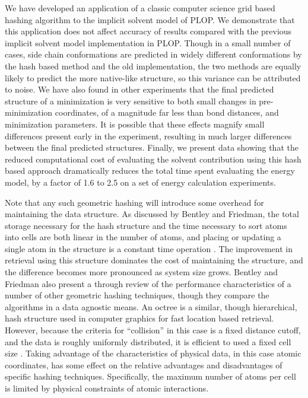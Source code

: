 We have developed an application of a classic computer science grid based hashing algorithm to the implicit solvent model of PLOP.
We demonstrate that this application does not affect accuracy of results compared with the previous implicit solvent model implementation in PLOP.
Though in a small number of cases, side chain conformations are predicted in widely different conformations by the hash based method and the old implementation, the two methods are equally likely to predict the more native-like structure, so this variance can be attributed to noise.
We have also found in other experiments that the final predicted structure of a minimization is very sensitive to both small changes in pre-minimization coordinates, of a magnitude far less than bond distances, and minimization parameters.
It is possible that these effects magnify small differences present early in the experiment, resulting in much larger differences between the final predicted structures.
Finally, we present data showing that the reduced computational cost of evaluating the solvent contribution using this hash based approach dramatically reduces the total time spent evaluating the energy model, by a factor of 1.6 to 2.5 on a set of energy calculation experiments.

Note that any such geometric hashing will introduce some overhead for maintaining the data structure.
As discussed by Bentley and Friedman, the total storage necessary for the hash structure and the time necessary to sort atoms into cells are both linear in the number of atoms, and placing or updating a single atom in the structure is a constant time operation \cite{bentley1979data}.
The improvement in retrieval using this structure dominates the cost of maintaining the structure, and the difference becomes more pronounced as system size grows.
Bentley and Friedman also present a through review of the performance characteristics of a number of other geometric hashing techniques, though they compare the algorithms in a data agnostic means.
An octree is a similar, though hierarchical, hash structure used in computer graphics for fast location based retrieval.
However, because the criteria for ``collision'' in this case is a fixed distance cutoff, and the data is roughly uniformly distributed, it is efficient to used a fixed cell size \cite{turk1989interactive}.
Taking advantage of the characteristics of physical data, in this case atomic coordinates, has some effect on the relative advantages and disadvantages of specific hashing techniques. 
Specifically, the maximum number of atoms per cell is limited by physical constraints of atomic interactions.


